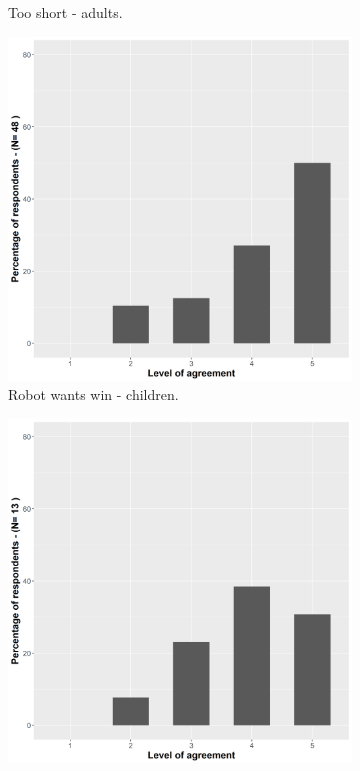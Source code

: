 \begin{figure}[t]
\begin{subfigure}[t]{0.49\columnwidth}
    \caption{Too short - adults.}
    \label{fig::staticTooShortAdults}
  \end{subfigure}
  \begin{subfigure}[t]{0.49\columnwidth}
  \centering
    \includegraphics[width=\linewidth]{images/06-deception/staticWinYoung}
    \caption{Robot wants win - children.}
    \label{fig::staticWinYoung}
  \end{subfigure} 
  \begin{subfigure}[t]{0.49\columnwidth}
    \centering
    \includegraphics[width=\linewidth]{images/06-deception/staticWinAdults}

\end{subfigure}
\end{figure}
